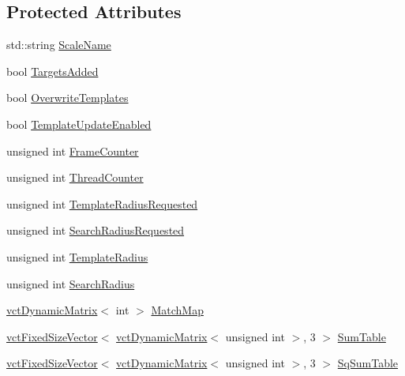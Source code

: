 \subsection*{Protected Attributes}
\begin{DoxyCompactItemize}
\item 
std\+::string \hyperlink{classsvl_tracker_m_s_brute_force_a1e48647fd161e3c9dd6fff65b3c5243d}{Scale\+Name}
\item 
bool \hyperlink{classsvl_tracker_m_s_brute_force_afc769fd867e5fd511d8e866d6afc0cef}{Targets\+Added}
\item 
bool \hyperlink{classsvl_tracker_m_s_brute_force_ac7a340867937fb943fdfec8761fe5271}{Overwrite\+Templates}
\item 
bool \hyperlink{classsvl_tracker_m_s_brute_force_a91ed76d3ee8a263cfb9505458105d15f}{Template\+Update\+Enabled}
\item 
unsigned int \hyperlink{classsvl_tracker_m_s_brute_force_aadd564cde91b04c46b59a9040a581f7b}{Frame\+Counter}
\item 
unsigned int \hyperlink{classsvl_tracker_m_s_brute_force_ac89d9f21981711ec7c4b08e57f66ef99}{Thread\+Counter}
\item 
unsigned int \hyperlink{classsvl_tracker_m_s_brute_force_aee46bfec573c07156546b96268d1260b}{Template\+Radius\+Requested}
\item 
unsigned int \hyperlink{classsvl_tracker_m_s_brute_force_a50aa9929292526c7e8befbd0cd3e0a1b}{Search\+Radius\+Requested}
\item 
unsigned int \hyperlink{classsvl_tracker_m_s_brute_force_a1d8d977d818d959b48a246d90f46078f}{Template\+Radius}
\item 
unsigned int \hyperlink{classsvl_tracker_m_s_brute_force_a85f55059dc58f50521118f18b27ab5be}{Search\+Radius}
\item 
\hyperlink{classvct_dynamic_matrix}{vct\+Dynamic\+Matrix}$<$ int $>$ \hyperlink{classsvl_tracker_m_s_brute_force_a75103ffe8ce2320d23c2b67e5179ddcd}{Match\+Map}
\item 
\hyperlink{classvct_fixed_size_vector}{vct\+Fixed\+Size\+Vector}$<$ \hyperlink{classvct_dynamic_matrix}{vct\+Dynamic\+Matrix}$<$ unsigned int $>$, 3 $>$ \hyperlink{classsvl_tracker_m_s_brute_force_a31316d5309eb29726f47be49a2342def}{Sum\+Table}
\item 
\hyperlink{classvct_fixed_size_vector}{vct\+Fixed\+Size\+Vector}$<$ \hyperlink{classvct_dynamic_matrix}{vct\+Dynamic\+Matrix}$<$ unsigned int $>$, 3 $>$ \hyperlink{classsvl_tracker_m_s_brute_force_ac8d7ec3446ee26262b3988d2257fd1f3}{Sq\+Sum\+Table}

\end{DoxyCompactItemize}
